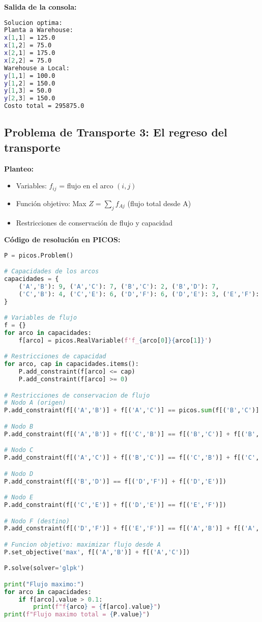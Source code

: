 \documentclass[12pt]{article}
\begin{document}
\textbf{Salida de la consola:}
\begin{lstlisting}[language=bash,backgroundcolor=\color{black},basicstyle=\color{white}\ttfamily,numbers=none]
Solucion optima:
Planta a Warehouse:
x[1,1] = 125.0
x[1,2] = 75.0
x[2,1] = 175.0
x[2,2] = 75.0
Warehouse a Local:
y[1,1] = 100.0
y[1,2] = 150.0
y[1,3] = 50.0
y[2,3] = 150.0
Costo total = 295875.0
\end{lstlisting}

\subsection{Problema de Transporte 3: El regreso del transporte}

\textbf{Planteo:}
\begin{itemize}
\item Variables: $f_{ij}$ = flujo en el arco $(i,j)$
\item Función objetivo: Max $Z = \sum_{j} f_{Aj}$ (flujo total desde A)
\item Restricciones de conservación de flujo y capacidad
\end{itemize}

\textbf{Código de resolución en PICOS:}
\begin{lstlisting}[language=Python]
P = picos.Problem()

# Capacidades de los arcos
capacidades = {
    ('A','B'): 9, ('A','C'): 7, ('B','C'): 2, ('B','D'): 7,
    ('C','B'): 4, ('C','E'): 6, ('D','F'): 6, ('D','E'): 3, ('E','F'): 9
}

# Variables de flujo
f = {}
for arco in capacidades:
    f[arco] = picos.RealVariable(f'f_{arco[0]}{arco[1]}')

# Restricciones de capacidad
for arco, cap in capacidades.items():
    P.add_constraint(f[arco] <= cap)
    P.add_constraint(f[arco] >= 0)

# Restricciones de conservacion de flujo
# Nodo A (origen)
P.add_constraint(f[('A','B')] + f[('A','C')] == picos.sum(f[('B','C')] + f[('C','B')] + f[('D','E')] + f[('E','F')]))

# Nodo B
P.add_constraint(f[('A','B')] + f[('C','B')] == f[('B','C')] + f[('B','D')])

# Nodo C
P.add_constraint(f[('A','C')] + f[('B','C')] == f[('C','B')] + f[('C','E')])

# Nodo D
P.add_constraint(f[('B','D')] == f[('D','F')] + f[('D','E')])

# Nodo E
P.add_constraint(f[('C','E')] + f[('D','E')] == f[('E','F')])

# Nodo F (destino)
P.add_constraint(f[('D','F')] + f[('E','F')] == f[('A','B')] + f[('A','C')])

# Funcion objetivo: maximizar flujo desde A
P.set_objective('max', f[('A','B')] + f[('A','C')])

P.solve(solver='glpk')

print("Flujo maximo:")
for arco in capacidades:
    if f[arco].value > 0.1:
        print(f"f{arco} = {f[arco].value}")
print(f"Flujo maximo total = {P.value}")
\end{lstlisting}
\end{document}
